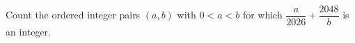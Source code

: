 Count the ordered integer pairs $(a,b)$ with $0<a<b$ for which $\dfrac{a}{2026}+\dfrac{2048}{b}$ is an integer.
